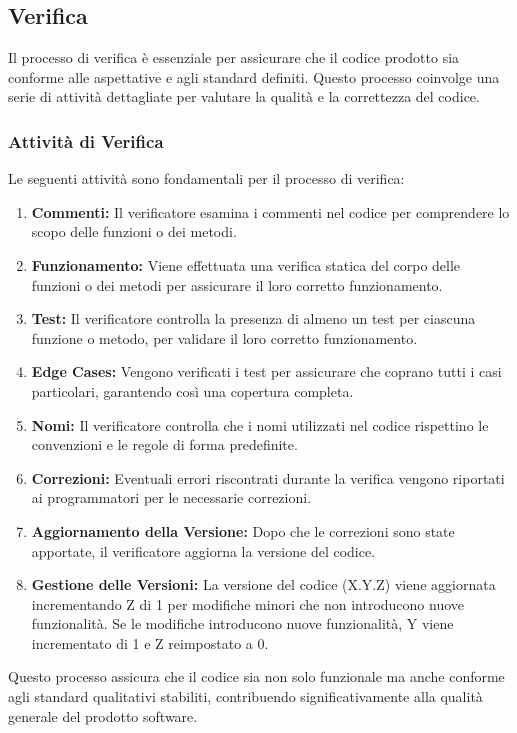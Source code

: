\subsection{Verifica}

Il processo di verifica è essenziale per assicurare che il codice prodotto sia
conforme alle aspettative e agli standard definiti. Questo processo coinvolge
una serie di attività dettagliate per valutare la qualità e la correttezza del
codice.

\subsubsection{Attività di Verifica}
Le seguenti attività sono fondamentali per il processo di verifica:

\begin{enumerate}
	\item \textbf{Commenti:} Il verificatore esamina i commenti nel codice per
	      comprendere lo scopo delle funzioni o dei metodi.
	\item \textbf{Funzionamento:} Viene effettuata una verifica statica del
	      corpo delle funzioni o dei metodi per assicurare il loro corretto
	      funzionamento.
	\item \textbf{Test:} Il verificatore controlla la presenza di almeno un test
	      per ciascuna funzione o metodo, per validare il loro corretto
	      funzionamento.
	\item \textbf{Edge Cases:} Vengono verificati i test per assicurare che
	      coprano tutti i casi particolari, garantendo così una copertura
	      completa.
	\item \textbf{Nomi:} Il verificatore controlla che i nomi utilizzati nel
	      codice rispettino le convenzioni e le regole di forma predefinite.
	\item \textbf{Correzioni:} Eventuali errori riscontrati durante la verifica
	      vengono riportati ai programmatori per le necessarie correzioni.
	\item \textbf{Aggiornamento della Versione:} Dopo che le correzioni sono
	      state apportate, il verificatore aggiorna la versione del codice.
	\item \textbf{Gestione delle Versioni:} La versione del codice (X.Y.Z) viene
	      aggiornata incrementando Z di 1 per modifiche minori che non
	      introducono nuove funzionalità. Se le modifiche introducono nuove
	      funzionalità, Y viene incrementato di 1 e Z reimpostato a 0.
\end{enumerate}

Questo processo assicura che il codice sia non solo funzionale ma anche
conforme agli standard qualitativi stabiliti, contribuendo significativamente
alla qualità generale del prodotto software.

